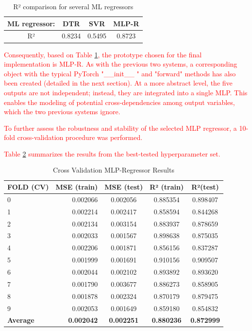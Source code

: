 \documentclass[review]{elsarticle}
\begin{document}
{{\begin{table}[H]
    \centering
    \begin{tabular}{|c|c|c|c|}\hline
         ML regressor:&  DTR&  SVR& MLP-R\\\hline
         R²&  0.8234&  0.5495& 0.8723\\ \hline
    \end{tabular}
    \caption{R² comparison for several ML regressors}
    \label{tab:placeholder}
\end{table}

\textcolor{red}{Consequently, based on Table \ref{tab:placeholder}, the prototype chosen for the final implementation is MLP-R. As with the previous two systems, a corresponding object with the typical PyTorch  "\_\_init\_\_ " and "forward" methods has also been created (detailed in the next section). At a more abstract level, the five outputs are not independent; instead, they are integrated into a single MLP. This enables the modeling of potential cross‑dependencies among output variables, which the two previous systems ignore.}

\textcolor{red}{To further assess the robustness and stability of the selected MLP regressor, a 10-fold cross-validation procedure was performed.}

\textcolor{red}{Table \ref{tab:CV MLP-R} summarizes the results from the best-tested hyperparameter set.}}
\begin{table}
    \centering
    \begin{tabular}{lrccc}\toprule
 FOLD (CV)& MSE (train)& MSE (test)& R² (train)&R²(test)\\\midrule
          0&0.002066&  0.002056&  0.885354&  0.898407\\
          1&0.002214&  0.002417&  0.858594&  0.844268\\
          2&0.002134&  0.003154&  0.883937&  0.878659\\
          3&0.002033&  0.001567&  0.898638&  0.875035\\
          4&0.002206&  0.001871&  0.856156&  0.837287\\
          5&0.001999&  0.001691&  0.910156&  0.909507\\
          6&0.002044&  0.002102&  0.893892&  0.893620\\
          7&0.001790&  0.003677&  0.886273&  0.858905\\
          8&0.001878&  0.002324&  0.870179&  0.879475\\
          9&0.002053&  0.001649&  0.859180&  0.854832\\
 \textbf{Average}& \textbf{0.002042}& \textbf{0.002251}& \textbf{0.880236}&\textbf{0.872999}\\ \bottomrule
    \end{tabular}
    \caption{Cross Validation MLP-Regressor Results}
    \label{tab:CV MLP-R}
\end{table}

}
\end{document}
